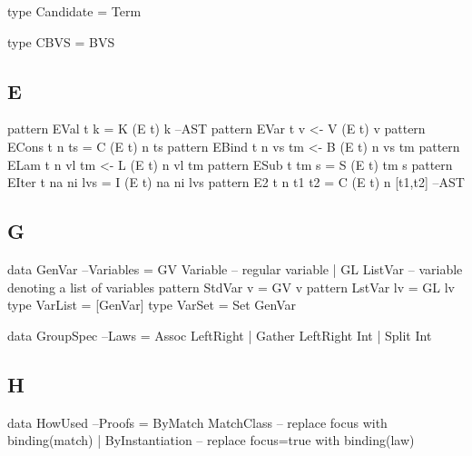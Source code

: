 \begin{code}
type Candidate = Term
\end{code}

\begin{code}
type CBVS = BVS
\end{code}

\newpage
\subsection{E}


\begin{code}
pattern EVal t k           =  K (E t) k                                  --AST
pattern EVar t v          <-  V (E t) v
pattern ECons t n ts       =  C (E t) n ts
pattern EBind t n vs tm   <-  B (E t) n vs tm
pattern ELam t n vl tm    <-  L (E t) n vl tm
pattern ESub t tm s        =  S (E t) tm s
pattern EIter t na ni lvs  =  I (E t) na ni lvs
pattern E2 t n t1 t2       =  C (E t) n [t1,t2]                          --AST
\end{code}


\subsection{G}

\begin{code}
data GenVar                                                        --Variables
 = GV Variable -- regular variable
 | GL ListVar  -- variable denoting a list of variables
pattern StdVar v = GV v
pattern LstVar lv = GL lv
type VarList = [GenVar]
type VarSet = Set GenVar
\end{code}

\begin{code}
data GroupSpec                                                          --Laws
  = Assoc LeftRight
  | Gather LeftRight Int
  | Split Int
\end{code}

\subsection{H}

\begin{code}
data HowUsed                                                          --Proofs
  = ByMatch MatchClass  -- replace focus with binding(match)
  | ByInstantiation     -- replace focus=true with binding(law)
\end{code}

